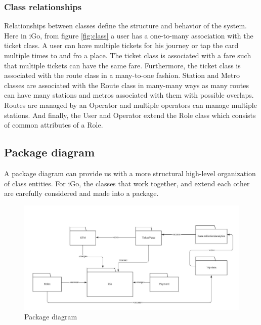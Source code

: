 \documentclass{article}
\begin{document}
\subsubsection{Class relationships}
Relationships between classes define the structure and behavior of the system. Here in iGo, from figure \ref{fig:class} a user has a one-to-many association with the ticket class. A user can have multiple tickets for his journey or tap the card multiple times to and fro a place. The ticket class is associated with a fare such that multiple tickets can have the same fare. Furthermore, the ticket class is associated with the route class in a many-to-one fashion. Station and Metro classes are associated with the Route class in many-many ways as many routes can have many stations and metros associated with them with possible overlaps. Routes are managed by an Operator and multiple operators can manage multiple stations. And finally, the User and Operator extend the Role class which consists of common attributes of a Role.
\subsection{Package diagram}
A package diagram can provide us with a more structural high-level organization of class entities. For iGo, the classes that work together, and extend each other are carefully considered and made into a package.
\begin{figure}
    \centering
    \includegraphics[scale=0.5]{UML package diagram.jpeg}
    \caption{Package diagram}
    \label{fig:package}
\end{figure}
\end{document}
